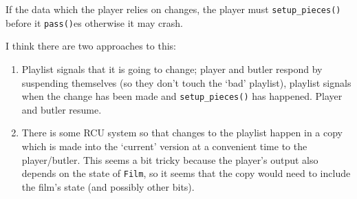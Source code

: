 \documentclass{article}
\begin{document}
If the data which the player relies on changes, the player must \texttt{setup\_pieces()} before it \texttt{pass()}es otherwise it may crash.

I think there are two approaches to this:

\begin{enumerate}

\item Playlist signals that it is going to change; player and
butler respond by suspending themselves (so they don't touch the `bad'
playlist), playlist signals when the change has been made and
\texttt{setup\_pieces()} has happened.  Player and butler resume.

\item There is some RCU system so that changes to the playlist happen in a copy
which is made into the `current' version at a convenient time to the
player/butler.  This seems a bit tricky because the player's output also
depends on the state of \texttt{Film}, so it seems that the copy would need to
include the film's state (and possibly other bits).

\end{enumerate}
\end{document}
